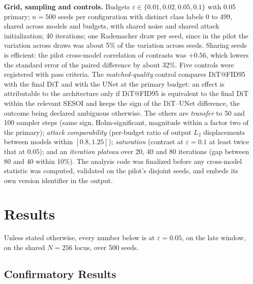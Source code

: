 \documentclass{article}
\begin{document}
\textbf{Grid, sampling and controls.} Budgets $\varepsilon \in \{0.01, 0.02, 0.05, 0.1\}$ with 0.05 primary; $n{=}500$ seeds per configuration with distinct class labels 0 to 499, shared across models and budgets, with shared noise and shared attack initialization; 40 iterations; one Rademacher draw per seed, since in the pilot the variation across draws was about 5\% of the variation across seeds. Sharing seeds is efficient: the pilot cross-model correlation of contrasts was $+0.56$, which lowers the standard error of the paired difference by about 32\%. Five controls were registered with pass criteria. The \textit{matched-quality} control compares DiT@FID95 with the final DiT and with the UNet at the primary budget: an effect is attributable to the architecture only if DiT@FID95 is equivalent to the final DiT within the relevant SESOI and keeps the sign of the DiT--UNet difference, the outcome being declared ambiguous otherwise. The others are \textit{transfer} to 50 and 100 sampler steps (same sign, Holm-significant, magnitude within a factor two of the primary); \textit{attack comparability} (per-budget ratio of output $L_2$ displacements between models within $[0.8, 1.25]$); \textit{saturation} (contrast at $\varepsilon{=}0.1$ at least twice that at 0.05); and an \textit{iteration plateau} over 20, 40 and 80 iterations (gap between 80 and 40 within 10\%). The analysis code was finalized before any cross-model statistic was computed, validated on the pilot's disjoint seeds, and embeds its own version identifier in the output.

\section{Results}\label{sec:results}

Unless stated otherwise, every number below is at $\varepsilon{=}0.05$, on the late window, on the shared $N{=}256$ locus, over 500 seeds.

\subsection{Confirmatory Results}\label{sec:confirmatory}
\end{document}

